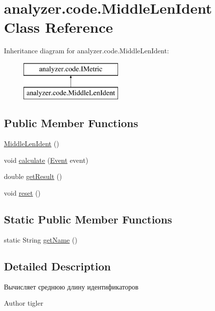 \hypertarget{classanalyzer_1_1code_1_1MiddleLenIdent}{}\section{analyzer.\+code.\+Middle\+Len\+Ident Class Reference}
\label{classanalyzer_1_1code_1_1MiddleLenIdent}
Inheritance diagram for analyzer.\+code.\+Middle\+Len\+Ident\+:\begin{figure}[H]
\begin{center}
\leavevmode
\includegraphics[height=2.000000cm]{classanalyzer_1_1code_1_1MiddleLenIdent}
\end{center}
\end{figure}
\subsection*{Public Member Functions}
\begin{DoxyCompactItemize}
\item 
\hyperlink{classanalyzer_1_1code_1_1MiddleLenIdent_a213f80eaaa3184f332af26ac940eed65}{Middle\+Len\+Ident} ()
\item 
void \hyperlink{classanalyzer_1_1code_1_1MiddleLenIdent_a8cdcf24eba4d3db76e9483ffaa2b6ea3}{calculate} (\hyperlink{classanalyzer_1_1code_1_1Event}{Event} event)
\item 
double \hyperlink{classanalyzer_1_1code_1_1MiddleLenIdent_a46411e2d526efa424d894a7b5c950625}{get\+Result} ()
\item 
void \hyperlink{classanalyzer_1_1code_1_1MiddleLenIdent_ac88413fab29f0d35a48e32c3471eb82b}{reset} ()
\end{DoxyCompactItemize}
\subsection*{Static Public Member Functions}
\begin{DoxyCompactItemize}
\item 
static String \hyperlink{classanalyzer_1_1code_1_1MiddleLenIdent_a4416bc43e60c97f489cccc3e6e9b67b1}{get\+Name} ()
\end{DoxyCompactItemize}


\subsection{Detailed Description}
Вычисляет среднюю длину идентификаторов \begin{DoxyAuthor}{Author}
tigler 
\end{DoxyAuthor}


